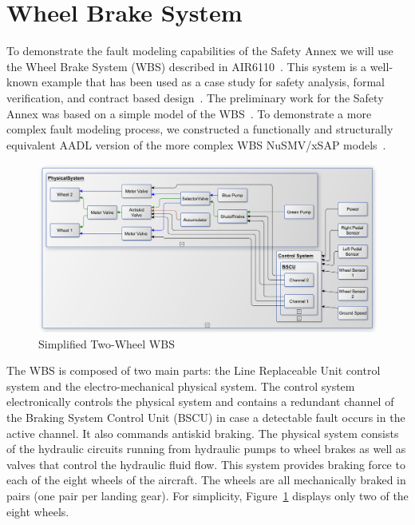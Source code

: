 \section{Wheel Brake System}
\label{sec:wbs}
To demonstrate the fault modeling capabilities of the Safety Annex we will use the Wheel Brake System (WBS) described in AIR6110~\cite{AIR6110}.  This system is a well-known example that has been used as a case study for safety analysis, formal verification, and contract based design~\cite{DBLP:conf/cav/BozzanoCPJKPRT15, 10.1007/978-3-319-11936-6-7, CAV2015:BoCiGrMa, Joshi05:SafeComp}. The preliminary work for the Safety Annex was based on a simple model of the WBS~\cite{Stewart17:IMBSA}. To demonstrate a more complex fault modeling process, we constructed a functionally and structurally equivalent AADL version of the more complex WBS NuSMV/xSAP models~\cite{DBLP:conf/cav/BozzanoCPJKPRT15}.    

\begin{figure}[htbp]
	\centering
	\includegraphics[trim=0 9 0 5,clip,width=\textwidth]{images/wbs_arch4_diagram.pdf}
	\caption{Simplified Two-Wheel WBS}
	\label{fig:wbs}
\end{figure} 

The WBS is composed of two main parts: the Line Replaceable Unit control system and the electro-mechanical physical system.
The control system electronically controls the physical system and contains a redundant
channel of the Braking System Control Unit (BSCU) in case a detectable fault occurs in the active channel.
 It also commands antiskid braking. %
 The physical system consists of the hydraulic circuits running from hydraulic pumps to wheel brakes as well as valves that control the hydraulic fluid flow. This system provides braking force to each of the eight wheels of the aircraft. The wheels are all mechanically braked in pairs (one pair per landing gear). For simplicity, Figure~\ref{fig:wbs} displays only two of the eight wheels. 

